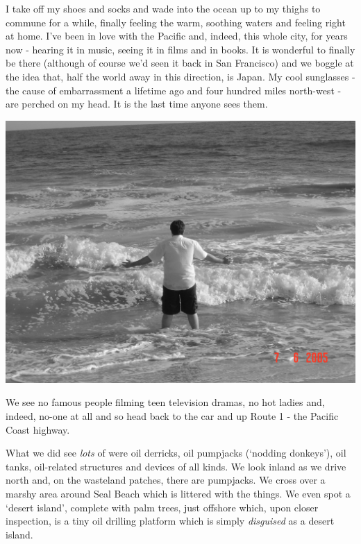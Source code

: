 \documentclass[a5paper,titlepage,11pt,draft]{book}
\begin{document}
I take off my shoes and socks and wade into the ocean up to my thighs to commune for a while, finally feeling the warm, soothing waters and feeling right at home.  I've been in love with the Pacific and, indeed, this whole city, for years now - hearing it in music, seeing it in films and in books.  It is wonderful to finally be there (although of course we'd seen it back in San Francisco) and we boggle at the idea that, half the world away in this direction, is Japan.  My cool sunglasses - the cause of embarrassment a lifetime ago and four hundred miles north-west - are perched on my head.  It is the last time anyone sees them.

\begin{center}\includegraphics[width=\textwidth]{gfx/pacific}\end{center}

We see no famous people filming teen television dramas, no hot ladies and, indeed, no-one at all and so head back to the car and up Route 1 - the Pacific Coast highway.

What we did see \emph{lots} of were oil derricks, oil pumpjacks (`nodding donkeys'), oil tanks, oil-related structures and devices of all kinds.  We look inland as we drive north and, on the wasteland patches, there are pumpjacks.  We cross over a marshy area around Seal Beach which is littered with the things.  We even spot a `desert island', complete with palm trees, just offshore which, upon closer inspection, is a tiny oil drilling platform which is simply \emph{disguised} as a desert island.
\end{document}
